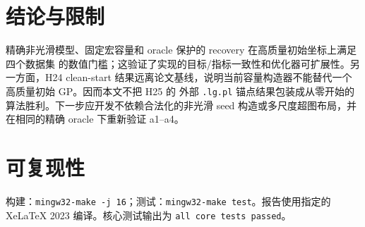 \documentclass[UTF8,a4paper,11pt]{ctexart}
\begin{document}
\section{结论与限制}
精确非光滑模型、固定宏容量和 oracle 保护的 recovery 在高质量初始坐标上满足四个数据集
的数值门槛；这验证了实现的目标/指标一致性和优化器可扩展性。另一方面，H24 clean-start
结果远离论文基线，说明当前容量构造器不能替代一个高质量初始 GP。因而本文不把 H25 的
外部 \texttt{.lg.pl} 锚点结果包装成从零开始的算法胜利。下一步应开发不依赖合法化的非光滑
seed 构造或多尺度超图布局，并在相同的精确 oracle 下重新验证 a1--a4。

\section*{可复现性}
构建：\texttt{mingw32-make -j 16}；测试：\texttt{mingw32-make test}。报告使用指定的
XeLaTeX 2023 编译。核心测试输出为 \texttt{all core tests passed}。
\end{document}
